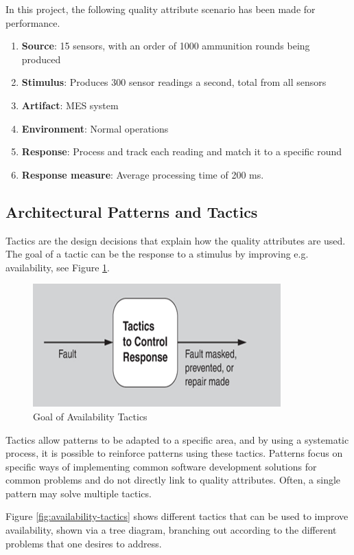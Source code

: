 In this project, the following quality attribute scenario has been made for performance.

\begin{enumerate}
    \item \textbf{Source}: 15 sensors, with an order of 1000 ammunition rounds being produced
    \item \textbf{Stimulus}: Produces 300 sensor readings a second, total from all sensors
    \item \textbf{Artifact}: MES system
    \item \textbf{Environment}: Normal operations
    \item \textbf{Response}: Process and track each reading and match it to a specific round 
    \item \textbf{Response measure}: Average processing time of 200 ms.
\end{enumerate}

\subsection{Architectural Patterns and Tactics}
Tactics are the design decisions that explain how the quality attributes are used. The goal of a tactic can be the response to a stimulus by improving e.g. availability, see Figure \ref{fig:goal-availablity tactics}.
\begin{figure}[hbt]
    \centering
    \caption{Goal of Availability Tactics}
    \label{fig:goal-availablity tactics}
    \includegraphics[width=0.5\linewidth]{images/Goal of availability tactics.png}
\end{figure}

Tactics allow patterns to be adapted to a specific area, and by using a systematic process, it is possible to reinforce patterns using these tactics.
Patterns focus on specific ways of implementing common software development solutions for common problems and do not directly link to quality attributes. Often, a single pattern may solve multiple tactics.

Figure \ref{fig:availability-tactics} shows different tactics that can be used to improve availability, shown via a tree diagram, branching out according to the different problems that one desires to address.

